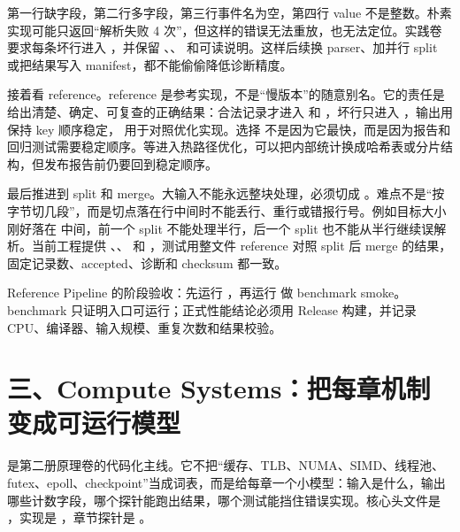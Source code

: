第一行缺字段，第二行多字段，第三行事件名为空，第四行 value 不是整数。朴素实现可能只返回“解析失败 4 次”，但这样的错误无法重放，也无法定位。实践卷要求每条坏行进入 ，并保留 、、 和可读说明。这样后续换 parser、加并行 split 或把结果写入 manifest，都不能偷偷降低诊断精度。

接着看 reference。reference 是参考实现，不是“慢版本”的随意别名。它的责任是给出清楚、确定、可复查的正确结果：合法记录才进入  和 ，坏行只进入 ，输出用  保持 key 顺序稳定， 用于对照优化实现。选择  不是因为它最快，而是因为报告和回归测试需要稳定顺序。等进入热路径优化，可以把内部统计换成哈希表或分片结构，但发布报告前仍要回到稳定顺序。

最后推进到 split 和 merge。大输入不能永远整块处理，必须切成 。难点不是“按字节切几段”，而是切点落在行中间时不能丢行、重行或错报行号。例如目标大小刚好落在  中间，前一个 split 不能处理半行，后一个 split 也不能从半行继续误解析。当前工程提供 、、 和 ，测试用整文件 reference 对照 split 后 merge 的结果，固定记录数、accepted、诊断和 checksum 都一致。

\begin{labbox}
Reference Pipeline 的阶段验收：先运行 ，再运行  做 benchmark smoke。benchmark 只证明入口可运行；正式性能结论必须用 Release 构建，并记录 CPU、编译器、输入规模、重复次数和结果校验。
\end{labbox}

\section{三、Compute Systems：把每章机制变成可运行模型}

 是第二册原理卷的代码化主线。它不把“缓存、TLB、NUMA、SIMD、线程池、futex、epoll、checkpoint”当成词表，而是给每章一个小模型：输入是什么，输出哪些计数字段，哪个探针能跑出结果，哪个测试能挡住错误实现。核心头文件是 ，实现是 ，章节探针是 。

